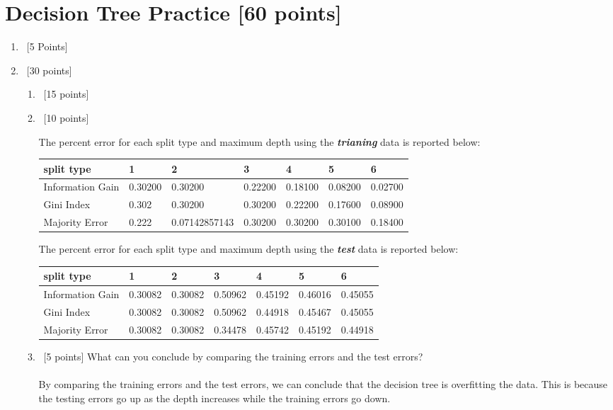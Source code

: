 \documentclass[12pt, fullpage,letterpaper]{article}
\begin{document}
\section{Decision Tree Practice [60 points]}
\begin{enumerate}
	\item~[5 Points] 
	
\item~[30 points] 





\begin{enumerate}
\item~[15 points] 
\item~[10 points] 

The percent error for each split type and maximum depth using the \emph\textbf{trianing} data is reported below:

\begin{tabular}{|l|l|l|l|l|l|l|}
	\hline
	split type       & 1       & 2             & 3       & 4       & 5       & 6       \\ \hline
	Information Gain & 0.30200 & 0.30200       & 0.22200 & 0.18100 & 0.08200 & 0.02700 \\ \hline
	Gini Index       & 0.302   & 0.30200       & 0.30200 & 0.22200 & 0.17600 & 0.08900 \\ \hline
	Majority Error   & 0.222   & 0.07142857143 & 0.30200 & 0.30200 & 0.30100 & 0.18400 \\ \hline
	\end{tabular}

The percent error for each split type and maximum depth using the \emph\textbf{test} data is reported below:

\begin{tabular}{|l|l|l|l|l|l|l|}
	\hline
	split type       & 1       & 2       & 3       & 4       & 5       & 6       \\ \hline
	Information Gain & 0.30082 & 0.30082 & 0.50962 & 0.45192 & 0.46016 & 0.45055 \\ \hline
	Gini Index       & 0.30082 & 0.30082 & 0.50962 & 0.44918 & 0.45467 & 0.45055 \\ \hline
	Majority Error   & 0.30082 & 0.30082 & 0.34478 & 0.45742 & 0.45192 & 0.44918 \\ \hline
	\end{tabular}

\item~[5 points] What can you conclude by comparing the training errors and the test errors? 
\\\\
By comparing the training errors and the test errors, we can conclude that the decision tree is overfitting the data. This is because the testing errors go up as the depth increases while the training errors go down.


\end{enumerate}
\end{enumerate}
\end{document}

